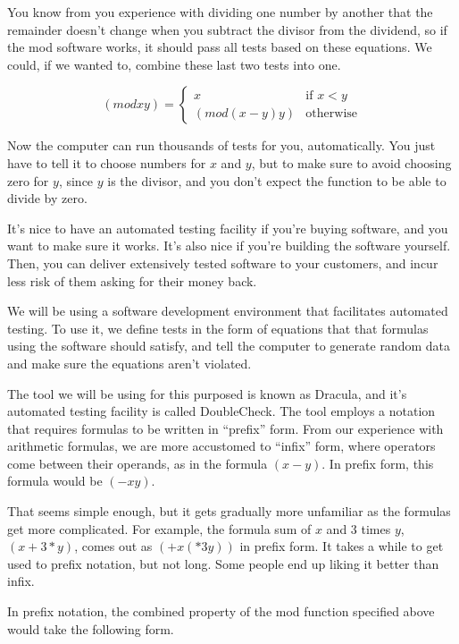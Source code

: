 You know from you experience with dividing one number by another that the remainder doesn't change when you subtract the divisor from the dividend, so if the mod software works, it should pass all tests based on these equations. We could, if we wanted to, combine these last two tests into one.

\begin{displaymath}
(mod x y) =
\left\{
        \begin{array}{ll}
                x               & \mbox{if } x < y \\
                (mod (x - y) y) & \mbox{otherwise}
        \end{array}
\right.
\end{displaymath}

Now the computer can run thousands of tests for you, automatically. You just have to tell it to choose numbers for $x$ and $y$, but to make sure to avoid choosing zero for $y$, since $y$ is the divisor, and you don't expect the function to be able to divide by zero.

It's nice to have an automated testing facility if you're buying software, and you want to make sure it works. It's also nice if you're building the software yourself. Then, you can deliver extensively tested software to your customers, and incur less risk of them asking for their money back.

We will be using a software development environment that facilitates automated testing. To use it, we define tests in the form of equations that that formulas using the software should satisfy, and tell the computer to generate random data and make sure the equations aren't violated.

The tool we will be using for this purposed is known as Dracula, and it's automated testing facility is called DoubleCheck. The tool employs a notation that requires formulas to be written in ``prefix'' form. From our experience with arithmetic formulas, we are more accustomed to ``infix'' form, where operators come between their operands, as in the formula $(x - y)$. In prefix form, this formula would be $(- x y)$.

That seems simple enough, but it gets gradually more unfamiliar as the formulas get more complicated. For example, the formula sum of $x$ and 3 times $y$, $(x + 3*y)$, comes out as $(+ x (* 3 y))$ in prefix form. It takes a while to get used to prefix notation, but not long. Some people end up liking it better than infix.

In prefix notation, the combined property of the mod function specified above would take the following form.

